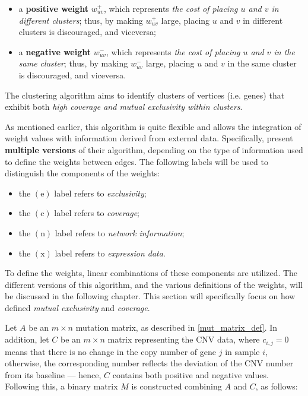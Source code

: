 \begin{itemize}
    \item a \textbf{positive weight} $w_{uv}^+$, which represents \textit{the cost of placing $u$ and $v$ in different clusters}; thus, by making $w_{uv}^+$ large, placing $u$ and $v$ in different clusters is discouraged, and viceversa;
    \item a \textbf{negative weight} $w_{uv}^-$, which represents \textit{the cost of placing $u$ and $v$ in the same cluster}; thus, by making $w_{uv}^-$ large, placing $u$ and $v$ in the same cluster is discouraged, and viceversa.
\end{itemize}

The clustering algorithm aims to identify clusters of vertices (i.e. genes) that exhibit both \textit{high coverage and mutual exclusivity within clusters}.

As mentioned earlier, this algorithm is quite flexible and allows the integration of weight values with information derived from external data. Specifically, \textcite{c3} present \textbf{multiple versions} of their algorithm, depending on the type of information used to define the weights between edges. The following labels will be used to distinguish the components of the weights:

\begin{itemize}
    \item the $(\mathrm e)$ label refers to \textit{exclusivity};
    \item the $(\mathrm c)$ label refers to \textit{coverage};
    \item the $(\mathrm n)$ label refers to \textit{network information};
    \item the $(\mathrm x)$ label refers to \textit{expression data}.
\end{itemize}

To define the weights, linear combinations of these components are utilized. The different versions of this algorithm, and the various definitions of the weights, will be discussed in the following chapter. This section will specifically focus on how \textcite{c3} defined \textit{mutual exclusivity} and \textit{coverage}.

Let $A$ be an $m \times n$ mutation matrix, as described in \cref{mut_matrix_def}. In addition, let $C$ be an $m \times n$ matrix representing the CNV data, where $c_{i, j} = 0$ means that there is no change in the copy number of gene $j$ in sample $i$, otherwise, the corresponding number reflects the deviation of the CNV number from its baseline --- hence, $C$ contains both positive and negative values. Following this, a binary matrix $M$ is constructed combining $A$ and $C$, as follows:

